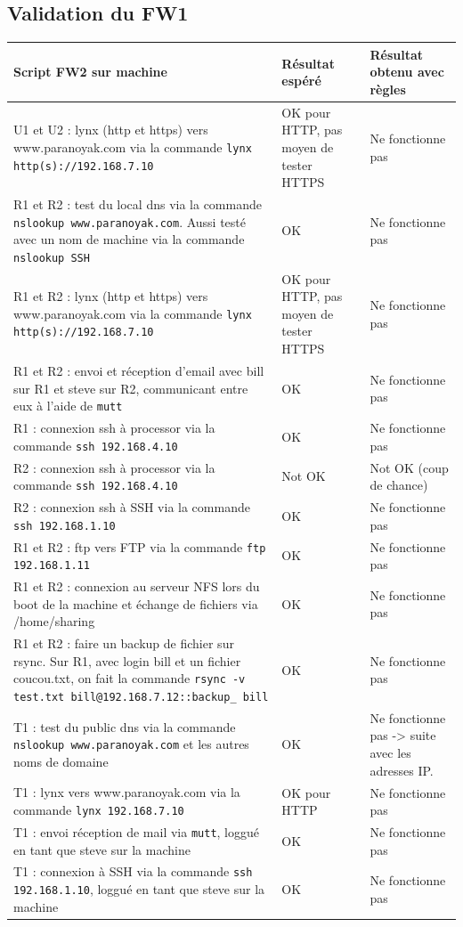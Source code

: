 \documentclass[11pt,a4paper]{article}
\begin{document}
\subsection{Validation du FW1}
\begin{longtable}{|p{8cm}|p{3cm}|p{3cm}|}
\hline
Script FW2 sur machine & Résultat espéré & Résultat obtenu avec règles\\
\hline
U1 et U2 : lynx (http et https) vers www.paranoyak.com via la commande \texttt{lynx http(s)://192.168.7.10} &  OK pour HTTP, pas moyen de tester HTTPS  & Ne fonctionne pas \\
\hline 
R1 et R2 : test du local dns via la commande \texttt{nslookup www.paranoyak.com}. Aussi testé avec un nom de machine via la commande \texttt{nslookup SSH} \ & OK  & Ne fonctionne pas  \\
\hline 
R1 et R2 : lynx (http et https) vers www.paranoyak.com via la commande \texttt{lynx http(s)://192.168.7.10} &  OK pour HTTP, pas moyen de tester HTTPS & Ne fonctionne pas \\
\hline 
R1 et R2 : envoi et réception d'email avec bill sur R1 et steve sur R2, communicant entre eux à l'aide de \texttt{mutt} & OK & Ne fonctionne pas \\
\hline 
R1 : connexion ssh à processor via la commande \texttt{ssh 192.168.4.10} & OK & Ne fonctionne pas \\
\hline
R2 : connexion ssh à processor via la commande \texttt{ssh 192.168.4.10} & Not OK & Not OK (coup de chance)\\
\hline
R2 : connexion ssh à SSH via la commande \texttt{ssh 192.168.1.10} & OK & Ne fonctionne pas\\
\hline
R1 et R2 : ftp vers FTP via la commande \texttt{ftp 192.168.1.11} & OK & Ne fonctionne pas  \\
\hline
R1 et R2 : connexion au serveur NFS lors du boot de la machine et échange de fichiers via /home/sharing & OK & Ne fonctionne pas \\
\hline
R1 et R2 : faire un backup de fichier sur rsync. Sur R1, avec login bill et un fichier coucou.txt, on fait la commande \texttt{rsync -v test.txt bill@192.168.7.12::backup\_ bill} & OK & Ne fonctionne pas \\
\hline
T1 : test du public dns via la commande \texttt{nslookup www.paranoyak.com} et les autres noms de domaine & OK  & Ne fonctionne pas -> suite avec les adresses IP.  \\
\hline 
T1 : lynx vers www.paranoyak.com via la commande \texttt{lynx 192.168.7.10} & OK pour HTTP & Ne fonctionne pas \\
\hline 
T1 : envoi réception de mail via \texttt{mutt}, loggué en tant que steve sur la machine & OK & Ne fonctionne pas \\
\hline
T1 : connexion à SSH via la commande \texttt{ssh 192.168.1.10}, loggué en tant que steve sur la machine & OK & Ne fonctionne pas \\
\hline
\end{longtable}
\end{document}
